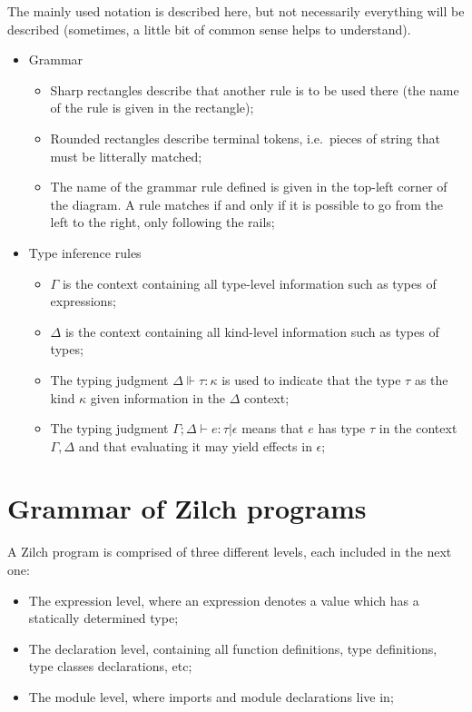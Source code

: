 The mainly used notation is described here, but not necessarily everything will be described (sometimes, a little bit of common sense helps to understand).

\begin{itemize}
	\item Grammar
	      \begin{figure}[H]
		      \centering
	      \end{figure}
	      \begin{itemize}
		      \item Sharp rectangles describe that another rule is to be used there (the name of the rule is given in the rectangle);
		      \item Rounded rectangles describe terminal tokens, i.e.\ pieces of string that must be litterally matched;
		      \item The name of the grammar rule defined is given in the top-left corner of the diagram.
		            A rule matches if and only if it is possible to go from the left to the right, only following the rails;
	      \end{itemize}
	\item Type inference rules
	      \begin{itemize}
		      \item $\Gamma$ is the context containing all type-level information such as types of expressions;
		      \item $\Delta$ is the context containing all kind-level information such as types of types;
		      \item The typing judgment $\Delta \Vdash \tau : \kappa$ is used to indicate that the type $\tau$ as the kind $\kappa$ given information in the $\Delta$ context;
		      \item The typing judgment $\Gamma;\Delta \vdash e : \tau \vert \epsilon$ means that $e$ has type $\tau$ in the context $\Gamma, \Delta$ and that evaluating it may yield effects in $\epsilon$;
	      \end{itemize}
\end{itemize}

\chapter{Grammar of Zilch programs}\label{chap:zilch-grammar}

A Zilch program is comprised of three different levels, each included in the next one:
\begin{itemize}
	\item The expression level, where an expression denotes a value which has a statically determined type;
	\item The declaration level, containing all function definitions, type definitions, type classes declarations, etc;
	\item The module level, where imports and module declarations live in;
\end{itemize}


